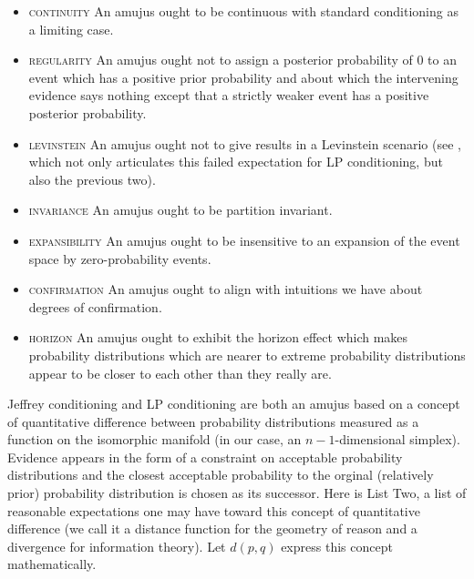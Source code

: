 \documentclass[phd,12pt,oneside]{ubcthesis}
\begin{document}
\begin{itemize}
\item \textsc{continuity} An amujus ought to be continuous with
  standard conditioning as a limiting case.
\item \textsc{regularity} An amujus ought not to assign a posterior
  probability of $0$ to an event which has a positive prior
  probability and about which the intervening evidence says nothing
  except that a strictly weaker event has a positive posterior
  probability.
\item \textsc{levinstein} An amujus ought not to give  results in a Levinstein scenario (see
  , which not only articulates this failed
  expectation for LP conditioning, but also the previous two).
\item \textsc{invariance} An amujus ought to be partition invariant.
\item \textsc{expansibility} An amujus ought to be insensitive to an
  expansion of the event space by zero-probability events.
\item \textsc{confirmation} An amujus ought to align with intuitions
  we have about degrees of confirmation.
\item \textsc{horizon} An amujus ought to exhibit the horizon effect
  which makes probability distributions which are nearer to extreme
  probability distributions appear to be closer to each other than
  they really are.
\end{itemize}

Jeffrey conditioning and LP conditioning are both an amujus based on a
concept of quantitative difference between probability distributions
measured as a function on the isomorphic manifold (in our case, an
$n-1$-dimensional simplex). Evidence appears in the form of a
constraint on acceptable probability distributions and the closest
acceptable probability to the orginal (relatively prior) probability
distribution is chosen as its successor. Here is List
Two\label{page:listtwo}, a list of reasonable expectations one may
have toward this concept of quantitative difference (we call it a
distance function for the geometry of reason and a divergence for
information theory). Let $d(p,q)$ express this concept mathematically.
\end{document}
